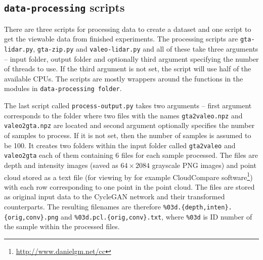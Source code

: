 \subsection{\texttt{data-processing} scripts}
There are three scripts for processing data to create a dataset and one script to get the viewable data from finished experiments. The processing scripts are \texttt{gta-lidar.py}, \texttt{gta-zip.py} and \texttt{valeo-lidar.py} and all of these take three arguments -- input folder, output folder and optionally third argument specifying the number of threads to use. If the third argument is not set, the script will use half of the available CPUs. The scripts are mostly wrappers around the functions in the modules in \texttt{data-processing folder}.

The last script called \texttt{process-output.py} takes two arguments -- first argument corresponds to the folder where two files with the names \texttt{gta2valeo.npz} and \texttt{valeo2gta.npz} are located and second argument optionally specifies the number of samples to process. If it is not set, then the number of samples is assumed to be 100. It creates two folders within the input folder called \texttt{gta2valeo} and \texttt{valeo2gta} each of them containing 6 files for each sample processed. The files are depth and intensity images (saved as $64\times2084$ grayscale PNG images) and point cloud stored as a text file (for viewing by for example CloudCompare software\footnote{\url{http://www.danielgm.net/cc}}) with each row corresponding to one point in the point cloud. The files are stored as original input data to the CycleGAN network and their transformed counterparts. The resulting filenames are therefore \texttt{\%03d.\{depth,inten\}.\{orig,conv\}.png} and \texttt{\%03d.pcl.\{orig,conv\}.txt}, where \texttt{\%03d} is ID number of the sample within the processed files.
